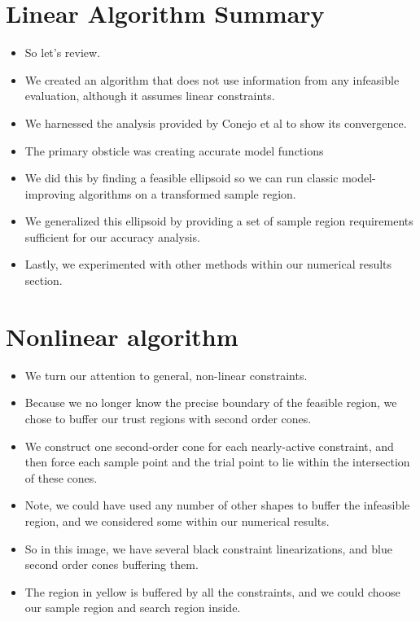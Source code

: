 \documentclass{article}
\begin{document}
	\section{Linear Algorithm Summary}
\begin{itemize}
\item So let's review.
\item We created an algorithm that does not use information from any infeasible evaluation, although it assumes linear constraints.
\item We harnessed the analysis provided by Conejo et al to show its convergence.
\item The primary obsticle was creating accurate model functions
\item We did this by finding a feasible ellipsoid so we can run classic model-improving algorithms on a transformed sample region. 
\item We generalized this ellipsoid by providing a set of sample region requirements sufficient for our accuracy analysis.
\item Lastly, we experimented with other methods within our numerical results section.
\end{itemize}



	\section{Nonlinear algorithm}
\begin{itemize}
\item We turn our attention to general, non-linear constraints.
\item Because we no longer know the precise boundary of the feasible region, we chose to buffer our trust regions with second order cones.
\item We construct one second-order cone for each nearly-active constraint, and then force each sample point and the trial point to lie within the intersection of these cones.
\item Note, we could have used any number of other shapes to buffer the infeasible region, and we considered some within our numerical results.
\item So in this image, we have several black constraint linearizations, and blue second order cones buffering them.
\item The region in yellow is buffered by all the constraints, and we could choose our sample region and search region inside.
\end{itemize}
\end{document}

